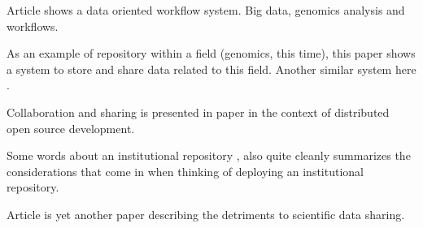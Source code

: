 Article \cite{DBLP:conf/bcb/PiredduLSZ14} shows a data oriented workflow
system. Big data, genomics analysis and workflows.

As an example of repository within a field (genomics, this time), this paper
\cite{craigon2004nascarrays} shows a system to store and share data related
to this field. Another similar system here \cite{DBLP:journals/nar/EdgarDL03}.

Collaboration and sharing is presented in paper \cite{craigon2004nascarrays} in
the context of distributed open source development.

Some words about an institutional repository \cite{gibbons2009benefits}, also
quite cleanly summarizes the considerations that come in when thinking of
deploying an institutional repository.

Article \cite{DBLP:conf/icegov/SayogoP11} is yet another paper describing
the detriments to scientific data sharing.
